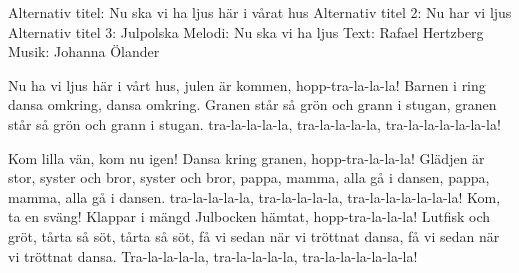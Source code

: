 \begin{song}

\begin{songmeta}
Alternativ titel: Nu ska vi ha ljus här i vårat hus
Alternativ titel 2: Nu har vi ljus
Alternativ titel 3: Julpolska
Melodi: Nu ska vi ha ljus
Text: Rafael Hertzberg
Musik: Johanna Ölander
\end{songmeta}

\begin{songtext}
Nu ha vi ljus här i vårt hus,
julen är kommen, hopp-tra-la-la-la!
Barnen i ring dansa omkring,
dansa omkring.
Granen står så grön och grann i stugan,
granen står så grön och grann i stugan.
tra-la-la-la-la, tra-la-la-la-la,
tra-la-la-la-la-la-la!

Kom lilla vän, kom nu igen!
Dansa kring granen, hopp-tra-la-la-la!
Glädjen är stor, syster och bror,
syster och bror,
pappa, mamma, alla gå i dansen,
pappa, mamma, alla gå i dansen.
tra-la-la-la-la, tra-la-la-la-la,
tra-la-la-la-la-la-la!
\newpage
Kom, ta en sväng! Klappar i mängd
Julbocken hämtat, hopp-tra-la-la-la!
Lutfisk och gröt, tårta så söt,
tårta så söt,
få vi sedan när vi tröttnat dansa,
få vi sedan när vi tröttnat dansa.
Tra-la-la-la-la, tra-la-la-la-la,
tra-la-la-la-la-la-la!
\end{songtext}
\end{song}
